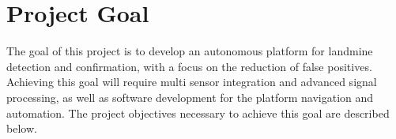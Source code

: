 \documentclass[main.tex]{subfiles}
\begin{document}
% 
% 
%

\section{Project Goal}

The goal of this project is to develop an autonomous platform for landmine detection and confirmation, with a focus on the reduction of false positives. Achieving this goal will require multi sensor integration and advanced signal processing, as well as software development for the platform navigation and automation. The project objectives necessary to achieve this goal are described below.
 
\end{document}
